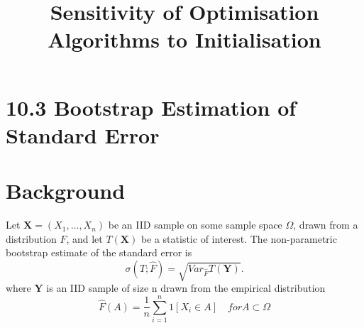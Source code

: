 \documentclass[10pt]{article}
\title{\flushleft2.4 Sensitivity of Optimisation Algorithms to Initialisation\\ }
\date{}
\begin{document}
\section*{\LARGE{10.3 Bootstrap Estimation of Standard Error}}
\bigskip
\section*{Background}
Let \(\mathbf{X}=(X_1,\dots, X_n)\) be an IID sample on some sample space $\Omega$, drawn from a distribution $F$, and let $T(\mathbf{X})$ be a statistic of interest.
The non-parametric bootstrap estimate of the standard error is \[\sigma(T;\hat{F})=\sqrt{Var_{\hat{F}}T(\mathbf{Y})}.\]
where $\mathbf{Y}$ is an IID sample of size n drawn from the empirical distribution \[\hat{F}(A)=\frac{1}{n}\sum_{i=1}^n1[X_i \in A] \quad for A \subset \Omega\]
\bigskip
\end{document}
